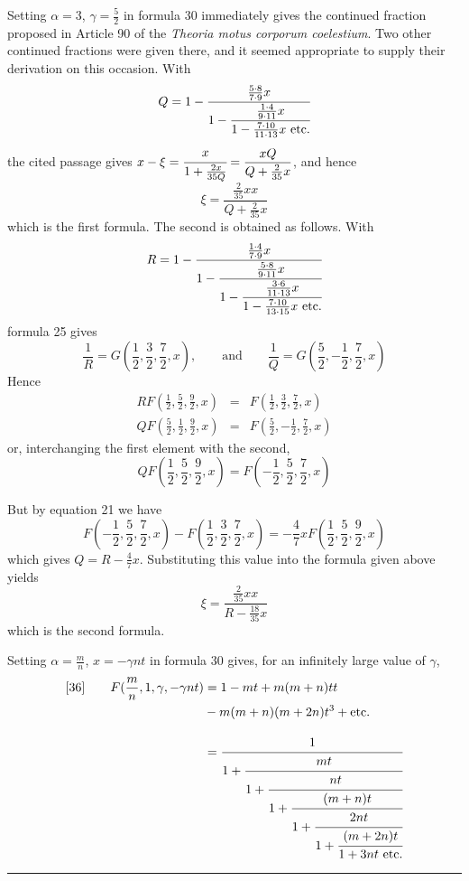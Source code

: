 Setting $\alpha=3$, $\gamma=\frac52$ in formula 30 immediately gives the continued fraction proposed in Article 90 of the \textit{Theoria motus corporum coelestium}. Two other continued fractions were given there, and it seemed appropriate to supply their derivation on this occasion. With
\[
Q=1-\cfrac{\frac{5\cdot8}{7\cdot9}x}{1-\cfrac{\frac{1\cdot4}{9\cdot11}x}{1-\frac{7\cdot10}{11\cdot13}x\ \mathrm{etc.}}}
\]
the cited passage gives $\displaystyle x-\xi=\cfrac{x}{1+\frac{2x}{35Q}}=\frac{xQ}{Q+\frac2{35}x}$, and hence
\[
\xi=\frac{\frac2{35}xx}{Q+\frac2{35}x}
\]
which is the first formula. The second is obtained as follows. With
\[
R=1-\cfrac{\frac{1\cdot4}{7\cdot9}x}{1-\cfrac{\frac{5\cdot8}{9\cdot11}x}{1-\cfrac{\frac{3\cdot6}{11\cdot13}x}{1-\frac{7\cdot10}{13\cdot15}x\ \mathrm{etc.}}}}
\]
formula 25 gives
\[
\frac1R=G(\frac12,\frac32,\frac72,x),
\qquad\mbox{and}\qquad
\frac1Q=G(\frac52,-\frac12,\frac72,x)
\]
Hence
\[
\begin{array}{rcl}
RF(\frac12,\frac52,\frac92,x)&=&F(\frac12,\frac32,\frac72,x)\\[4pt]
QF(\frac52,\frac12,\frac92,x)&=&F(\frac52,-\frac12,\frac72,x)
\end{array}
\]
or, interchanging the first element with the second,
\[
QF(\frac12,\frac52,\frac92,x)=F(-\frac12,\frac52,\frac72,x)
\]
\par
But by equation 21 we have
\[
F(-\frac12,\frac52,\frac72,x)-F(\frac12,\frac32,\frac72,x)
=-\frac47xF(\frac12,\frac52,\frac92,x)
\]
which gives $Q=R-\frac47x$. Substituting this value into the formula given above yields
\[
\xi=\frac{\frac2{35}xx}{R-\frac{18}{35}x}
\]
which is the second formula.
\par
Setting $\alpha=\frac mn$, $x=-\gamma nt$ in formula 30 gives, for an infinitely large value of $\gamma$,
\[
\begin{aligned}
{}[36]\qquad F(\frac mn,1,\gamma,-\gamma nt)
&=1-mt+m(m+n)tt\\&{}-m(m+n)(m+2n)t^3+\mathrm{etc.}\\[8pt]
&=\displaystyle\cfrac{1}{1+\cfrac{mt}{1+\cfrac{nt}{1+\cfrac{(m+n)t}{1+\cfrac{2nt}{1+\cfrac{(m+2n)t}{1+3nt\ \mathrm{etc.}}}}}}}
\end{aligned}
\]
\begin{center}\rule{0.27\textwidth}{0.4pt}\end{center}
